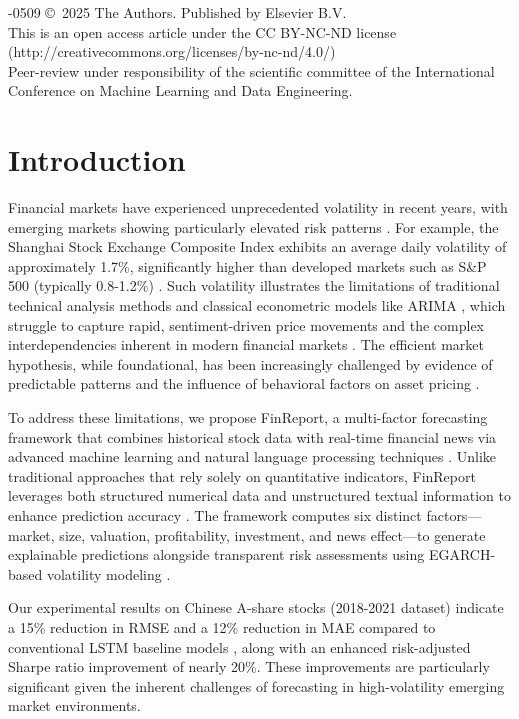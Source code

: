\documentclass[3p,times,procedia]{elsarticle}
\begin{document}
\vspace{6pt}
-0509 \copyright\ 2025 The Authors. Published by Elsevier B.V.\\
This is an open access article under the CC BY-NC-ND license (http://creativecommons.org/licenses/by-nc-nd/4.0/)\\
Peer-review under responsibility of the scientific committee of the International Conference on Machine Learning and Data Engineering.

\vspace{12pt}

\section{Introduction}
\label{main}

Financial markets have experienced unprecedented volatility in recent years, with emerging markets showing particularly elevated risk patterns \cite{Poon2003}. For example, the Shanghai Stock Exchange Composite Index exhibits an average daily volatility of approximately 1.7\%, significantly higher than developed markets such as S\&P 500 (typically 0.8-1.2\%) \cite{Chen2015}. Such volatility illustrates the limitations of traditional technical analysis methods and classical econometric models like ARIMA \cite{Box1970}, which struggle to capture rapid, sentiment-driven price movements and the complex interdependencies inherent in modern financial markets \cite{FAMA1993,Malkiel2003}. The efficient market hypothesis, while foundational, has been increasingly challenged by evidence of predictable patterns and the influence of behavioral factors on asset pricing \cite{Sharpe1964,Chen2015}.

To address these limitations, we propose FinReport, a multi-factor forecasting framework that combines historical stock data with real-time financial news via advanced machine learning and natural language processing techniques \cite{hochreiter1997lstm,Bao2017}. Unlike traditional approaches that rely solely on quantitative indicators, FinReport leverages both structured numerical data and unstructured textual information to enhance prediction accuracy \cite{Schumaker2009,Xing2018}. The framework computes six distinct factors---market, size, valuation, profitability, investment, and news effect---to generate explainable predictions alongside transparent risk assessments using EGARCH-based volatility modeling \cite{Nelson1991,Engle1982}.

Our experimental results on Chinese A-share stocks (2018-2021 dataset) \cite{FinReportDataset2025} indicate a 15\% reduction in RMSE and a 12\% reduction in MAE compared to conventional LSTM baseline models \cite{Fischer2018}, along with an enhanced risk-adjusted Sharpe ratio improvement of nearly 20\%. These improvements are particularly significant given the inherent challenges of forecasting in high-volatility emerging market environments.
\end{document}

